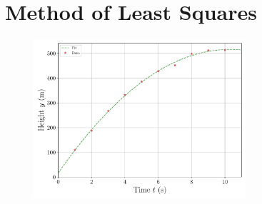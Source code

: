 \documentclass[a4paper,DIV=12,english]{scrartcl}
\begin{document}
\section{Method of Least Squares}

\begin{figure}
    \centering
    \includegraphics[width=0.7\textwidth]{../lstsq.pdf}
    \caption{}
    \label{fig:lstsq}
\end{figure}
\end{document}
